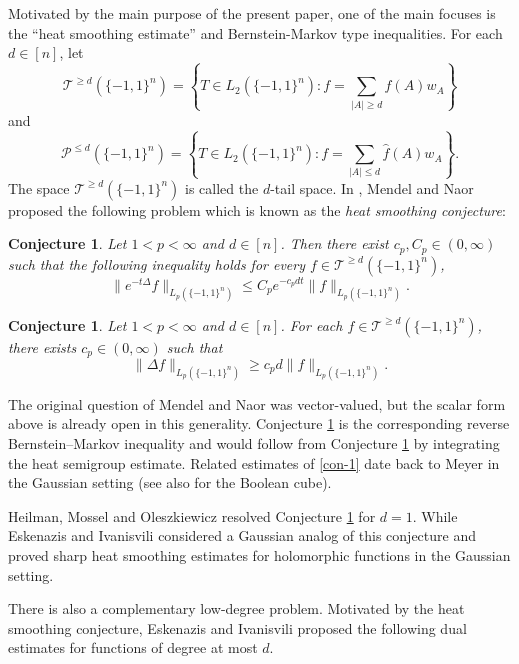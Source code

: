 \documentclass{amsbook}
\newtheorem{conjecture}[theorem]{Conjecture}
\theoremstyle{definition}
\theoremstyle{remark}
\numberwithin{section}{chapter}
\numberwithin{equation}{chapter}
\newcommand{\1}{\mathbf{1}}
\begin{document}
Motivated by the main purpose of the present paper, one of the main focuses is the ``heat smoothing estimate'' and Bernstein-Markov type inequalities. For each $d\in [n]$, let
\[
\mathcal{T}^{\geq d}(\{-1,1\}^n)=\left\{T\in L_{2}(\{-1,1\}^n):f=\sum_{|A|\geq d}\widehat{f}(A)w_{A}\right\}
\]
and 
\[
\mathcal{P}^{\leq d}(\{-1,1\}^n)=\left\{T\in L_{2}(\{-1,1\}^n):f=\sum_{|A|\leq d}\widehat{f}(A)w_{A}\right\}.
\]
The space $\mathcal{T}^{\geq d}(\{-1,1\}^n)$ is called the $d$-tail space. 
In \cite[Remark 5.5]{MN2014}, Mendel and Naor proposed the following problem which is known as the \emph{heat smoothing conjecture}:
\begin{conjecture}\label{conj-1}
Let $1<p<\infty$ and $d\in [n]$. Then there exist $c_p,C_p \in (0,\infty)$ such that the following inequality holds for every $f\in \mathcal{T}^{\geq d}(\{-1,1\}^n)$, 
\begin{equation}\label{con-1}
\|e^{-t\Delta} f\|_{L_p(\{-1,1\}^n)} \leq  C_p e^{-c_pdt} \|f\|_{L_p(\{-1,1\}^n)}.
\end{equation}
\end{conjecture}
\begin{conjecture}\label{conj-1-2}
Let $1<p<\infty$ and $d\in [n]$. For each $f\in \mathcal{T}^{\geq d}(\{-1,1\}^n)$, there exists $c_p\in  (0,\infty)$ such that 
\begin{equation}\label{con-2}
\|\Delta f\|_{L_p(\{-1,1\}^n)} \geq c_p d\|f\|_{L_p(\{-1,1\}^n)}.
\end{equation}
\end{conjecture}

The original question of Mendel and Naor  \cite{MN2014} was vector-valued, but the scalar form above is already open in this generality. Conjecture \ref{conj-1-2} is the corresponding reverse Bernstein--Markov inequality and would follow from Conjecture \ref{conj-1} by integrating the heat semigroup estimate. Related estimates of \eqref{con-1} date back to Meyer \cite{Me1984} in the Gaussian setting (see also \cite[Lemma 5.4]{MN2014} for the Boolean cube).

Heilman, Mossel and Oleszkiewicz \cite{HMO2017} resolved Conjecture \ref{conj-1} for $d=1$. While Eskenazis and Ivanisvili \cite{EI2023} considered a Gaussian analog of this conjecture and proved sharp heat smoothing estimates for holomorphic functions in the Gaussian setting.

There is also a complementary low-degree problem. Motivated by the heat smoothing conjecture, Eskenazis and Ivanisvili \cite{EI2020} proposed the following dual estimates for functions of degree
at most $d$.
\end{document}
